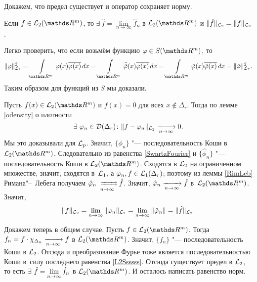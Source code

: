 Докажем, что предел существует и оператор сохраняет норму.
\begin{The}[Планшереля]\label{Plansh}
  Если $f\in\L_2(\R^m)$, то $\exists\ \hat f = \lim\limits_{n\to\infty} \hat f_n$ в $\L_2(\R^m)$ и $\|\hat f\|_{\mathcal L_2} = \|f\|_{\mathcal L_2}$.
\end{The}
\begin{Proof}
 Легко проверить, что если возьмём функцию $ \phi\in S(\R^m)$, то 
\begin{equation}\label{SwartzFourier}
  \|\phi\|_{\L_2}^2 = \Gint{\R^m}\phi(x)\ol{\phi(x)}\,dx = 
  \Gint{\R^m}\Til{\hat\phi}(x)\ol{\phi(x)}\,dx = 
  \Gint{\R^m}\hat \phi(x)\ol{\hat\phi(x)}\,dx = \|\hat\phi\|_{\L_2}^2.
\end{equation}
Таким образом для функций из $S$ мы доказали.

Пусть $f(x)\in\L_2(\R^m)$ и $f(x)=0$ для всех $x\not\in\Delta_r$. Тогда по лемме \ref{odensity} о плотности 
\[
  \exists\ \varphi_n\in\mathcal D(\Delta_r)\colon \|f-\varphi_n\|_{\mathcal L_2}\xrightarrow[n\rightarrow\infty]{}0.
\]
 Мы это доказывали для $\mathcal L_p$. Значит, $\{\phi_n\}$ "--- последовательность Коши в $\L_2(\R^m)$. Следовательно из равенства \eqref{SwartzFourier} и $\{\hat\phi_n\}$ "--- последовательность Коши в $\L_2(\R^m)$. Сходятся в $\mathcal L_2$ на ограниченном множестве, значит, сходятся в~$\mathcal L_1$, а $\varphi_n,f\in\mathcal L_1(\Delta_r)$; поэтому из леммы \ref{RimLeb} Римана"--~Лебега получаем $\hat\phi_n\rsh[ ] n\hat f$. Значит, $\hat{\varphi}_n\xrightarrow[n\rightarrow\infty]{} \hat f$ в~$\L_2(\R^m)$. Значит,
\begin{equation}\label{L2Ssssss}
  \|f\|_{\mathcal L_2} = \lim\limits_{n\rightarrow\infty}\|\varphi_n\|_{\mathcal L_2} = \lim\limits_{n\rightarrow\infty} \|\hat{\varphi}_n\| = \|\hat f\|_{\mathcal L_2}.
\end{equation}

Докажем теперь в общем случае. Пусть $f\in\L_2(\R^m)$. Тогда $f_n = f\cdot\chi_{\Delta_n}\xrightarrow[n\rightarrow\infty]{} f$ в $\L_2(\R^m)$. Значит, $\{f_n\}$ "--- последовательность Коши в $\mathcal L_2$. Отсюда и преобразование Фурье тоже является последовательностью Коши в~силу последнего равенства \eqref{L2Ssssss}. Отсюда существует предел в $\mathcal L_2$, то есть $\exists\ \hat f=\lim\limits_{n\rightarrow\infty} \hat f_n$ в $\L_2(\R^m)$. И осталось написать равенство норм.
\end{Proof}

